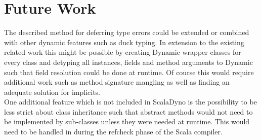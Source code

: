  \section{Future Work}

The described method for deferring type errors could be extended or combined with other dynamic features such as duck typing. In extension to the existing related work this might be possible by creating {\ttfamily Dynamic} wrapper classes for every class and detyping all instances, fields and method arguments to {\ttfamily Dynamic} such that field resolution could be done at runtime. Of course this would require additional work such as method signature mangling as well as finding an adequate solution for implicits.
\\
One additional feature which is not included in ScalaDyno is the possibility to be less strict about class inheritance such that abstract methods would not need to be implemented by sub-classes unless they were needed at runtime. This would need to be handled in during the {\ttfamily refcheck} phase of the Scala compiler.